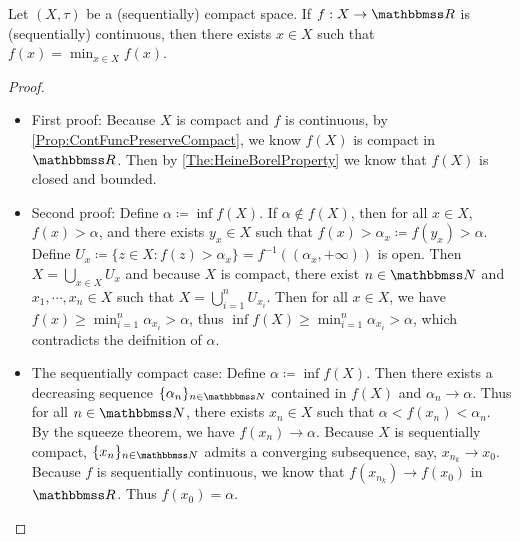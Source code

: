\documentclass[screen,single]{techreport}
\numberwithin{equation}{section}
\begin{document}
\begin{theorem}\label{The:Weierstrass}
	Let $(X,\tau)$ be a (sequentially) compact space.
	If $f: X\to\bbR$ is (sequentially) continuous, then there exists $x \in X$ such that $f(x) = \min_{x \in X} f(x)$.
\end{theorem}
\begin{proof}\
	\begin{itemize}
		\item First proof: Because $X$ is compact and $f$ is continuous, by \cref{Prop:ContFuncPreserveCompact}, we know $f(X)$ is compact in $\bbR$.
		Then by \cref{The:HeineBorelProperty} we know that $f(X)$ is closed and bounded.
		
		\item Second proof: Define $\alpha \coloneqq \inf f(X)$.
		If $\alpha \not\in f(X)$, then for all $x \in X$, $f(x) > \alpha$, and there exists $y_x \in X$ such that $f(x) > \alpha_x \coloneqq f(y_x) > \alpha$.
		Define $U_x \coloneqq \{ z \in X : f(z) > \alpha_x \} = f^{-1}((\alpha_x,+\infty))$ is open.
		Then $X = \bigcup_{x \in X} U_x$ and because $X$ is compact, there exist $n \in \bbN$ and $x_1,\cdots,x_n \in X$ such that $X = \bigcup_{i=1}^n U_{x_i}$.
		Then for all $x \in X$, we have $f(x) \ge \min_{i=1}^n \alpha_{x_i} > \alpha$, 
		thus $\inf f(X) \ge \min_{i=1}^n \alpha_{x_i} > \alpha$, which contradicts the deifnition of $\alpha$.
		
		\item The sequentially compact case: Define $\alpha \coloneqq \inf f(X)$.
		Then there exists a decreasing sequence $\{\alpha_n\}_{n \in \bbN}$ contained in $f(X)$ and $\alpha_n \rightarrow \alpha$.
		Thus for all $n \in \bbN$, there exists $x_n \in X$ such that $\alpha < f(x_n) < \alpha_n$.
		By the squeeze theorem, we have $f(x_n) \rightarrow \alpha$.
		Because $X$ is sequentially compact, $\{x_n\}_{n \in \bbN}$ admits a converging subsequence, say, $x_{n_k} \rightarrow x_0$.
		Because $f$ is sequentially continuous, we know that $f(x_{n_k}) \rightarrow f(x_0)$ in $\bbR$.
		Thus $f(x_0) = \alpha$.
	\end{itemize}
\end{proof}
\end{document}
